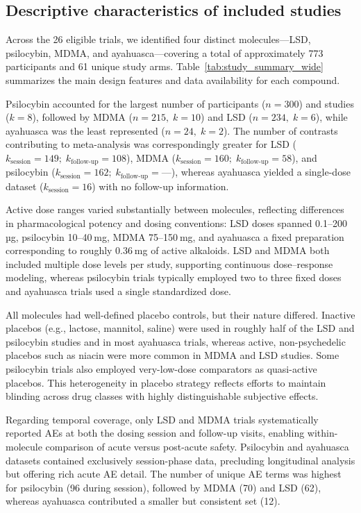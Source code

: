 \subsection{Descriptive characteristics of included studies}

Across the 26 eligible trials, we identified four distinct molecules—LSD, psilocybin, MDMA, and ayahuasca—covering a total of approximately 773 participants and 61 unique study arms. Table~\ref{tab:study_summary_wide} summarizes the main design features and data availability for each compound.

Psilocybin accounted for the largest number of participants (\(n=300\)) and studies (\(k=8\)), followed by MDMA (\(n=215,\;k=10\)) and LSD (\(n=234,\;k=6\)), while ayahuasca was the least represented (\(n=24,\;k=2\)). 
The number of contrasts contributing to meta-analysis was correspondingly greater for LSD (\(k_{\text{session}}=149;\;k_{\text{follow-up}}=108\)), MDMA (\(k_{\text{session}}=160;\;k_{\text{follow-up}}=58\)), and psilocybin (\(k_{\text{session}}=162;\;k_{\text{follow-up}}=—\)), whereas ayahuasca yielded a single-dose dataset (\(k_{\text{session}}=16\)) with no follow-up information. 

Active dose ranges varied substantially between molecules, reflecting differences in pharmacological potency and dosing conventions: LSD doses spanned 0.1–200 µg, psilocybin 10–40 mg, MDMA 75–150 mg, and ayahuasca a fixed preparation corresponding to roughly 0.36 mg of active alkaloids. 
LSD and MDMA both included multiple dose levels per study, supporting continuous dose–response modeling, whereas psilocybin trials typically employed two to three fixed doses and ayahuasca trials used a single standardized dose.

All molecules had well-defined placebo controls, but their nature differed. 
Inactive placebos (e.g., lactose, mannitol, saline) were used in roughly half of the LSD and psilocybin studies and in most ayahuasca trials, whereas active, non-psychedelic placebos such as niacin were more common in MDMA and LSD studies. 
Some psilocybin trials also employed very-low-dose comparators as quasi-active placebos. 
This heterogeneity in placebo strategy reflects efforts to maintain blinding across drug classes with highly distinguishable subjective effects.

Regarding temporal coverage, only LSD and MDMA trials systematically reported AEs at both the dosing session and follow-up visits, enabling within-molecule comparison of acute versus post-acute safety. 
Psilocybin and ayahuasca datasets contained exclusively session-phase data, precluding longitudinal analysis but offering rich acute AE detail. 
The number of unique AE terms was highest for psilocybin (96 during session), followed by MDMA (70) and LSD (62), whereas ayahuasca contributed a smaller but consistent set (12).

